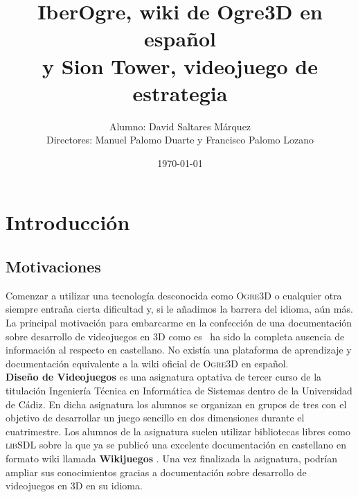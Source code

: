 \documentclass[a4paper,11pt]{article}
\title{IberOgre, wiki de Ogre3D en español\\y Sion Tower, videojuego de estrategia}
\author{Alumno: David Saltares Márquez\\Directores: Manuel Palomo Duarte y Francisco Palomo Lozano}
\date{\today}
\begin{document}
\maketitle


\tableofcontents

\section{Introducción}

\subsection{Motivaciones}

\noindent Comenzar a utilizar una tecnología desconocida como \textsc{Ogre3D} o cualquier
otra siempre entraña cierta dificultad y, si le añadimos la barrera del 
idioma, aún más. La principal motivación para embarcarme en la confección
de una documentación sobre desarrollo de videojuegos en 3D como es \wiki\
ha sido la completa ausencia de información al respecto en castellano.
No existía una plataforma de aprendizaje y documentación equivalente a
la wiki oficial de \textsc{Ogre3D} en español.\\

\noindent \textbf{Diseño de Videojuegos} es una asignatura optativa de tercer curso
de la titulación Ingeniería Técnica en Informática de Sistemas dentro
de la Universidad de Cádiz. En dicha asignatura los alumnos se organizan
en grupos de tres con el objetivo de desarrollar un juego sencillo en dos
dimensiones durante el cuatrimestre. Los alumnos de la
asignatura suelen utilizar bibliotecas libres como \textsc{libSDL} sobre la que ya se publicó
una excelente documentación en castellano en formato wiki llamada \textbf{Wikijuegos} \cite{website:wikijuegos}.
Una vez finalizada la asignatura, podrían ampliar
sus conocimientos gracias a documentación sobre desarrollo de videojuegos en
3D en su idioma.\\
\end{document}
